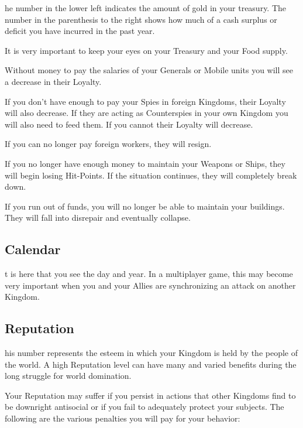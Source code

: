 
he number in the lower left indicates the amount of gold in your treasury. The number in the parenthesis to the right shows how much of a cash surplus or deficit you have incurred in the past year.

It is very important to keep your eyes on your Treasury and your Food supply.

Without money to pay the salaries of your Generals or Mobile units you will see a decrease in their Loyalty.

If you don’t have enough to pay your Spies in foreign Kingdoms, their Loyalty will also decrease. If they are acting as Counterspies in your own Kingdom you will also need to feed them. If you cannot their Loyalty will decrease.

If you can no longer pay foreign workers, they will resign.

If you no longer have enough money to maintain your Weapons or Ships, they will begin losing Hit-Points. If the situation continues, they will completely break down.

If you run out of funds, you will no longer be able to maintain your buildings. They will fall into disrepair and eventually collapse.

\subsection{Calendar}


t is here that you see the day and year. In a multiplayer game, this may become very important when you and your Allies are synchronizing an attack on another Kingdom.

\subsection{Reputation} %


his number represents the esteem in which your Kingdom is held by the people of the world. A high Reputation level can have many and varied benefits during the long struggle for world domination.

Your Reputation may suffer if you persist in actions that other Kingdoms find to be downright antisocial or if you fail to adequately protect your subjects. The following are the various penalties you will pay for your behavior:

